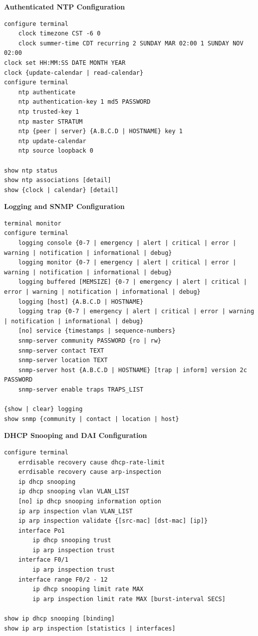 \documentclass[12pt]{article}
\begin{document}
	\textbf{Authenticated NTP Configuration}
	\begin{lstlisting}
configure terminal
	clock timezone CST -6 0
	clock summer-time CDT recurring 2 SUNDAY MAR 02:00 1 SUNDAY NOV 02:00
clock set HH:MM:SS DATE MONTH YEAR
clock {update-calendar | read-calendar}
configure terminal
	ntp authenticate
	ntp authentication-key 1 md5 PASSWORD
	ntp trusted-key 1
	ntp master STRATUM
	ntp {peer | server} {A.B.C.D | HOSTNAME} key 1
	ntp update-calendar
	ntp source loopback 0

show ntp status
show ntp associations [detail]
show {clock | calendar} [detail]
	\end{lstlisting}

	\textbf{Logging and SNMP Configuration}
	\begin{lstlisting}
terminal monitor
configure terminal
	logging console {0-7 | emergency | alert | critical | error | warning | notification | informational | debug}
	logging monitor {0-7 | emergency | alert | critical | error | warning | notification | informational | debug}
	logging buffered [MEMSIZE] {0-7 | emergency | alert | critical | error | warning | notification | informational | debug}
	logging [host] {A.B.C.D | HOSTNAME}
	logging trap {0-7 | emergency | alert | critical | error | warning | notification | informational | debug}
	[no] service {timestamps | sequence-numbers}
	snmp-server community PASSWORD {ro | rw}
	snmp-server contact TEXT
	snmp-server location TEXT
	snmp-server host {A.B.C.D | HOSTNAME} [trap | inform] version 2c PASSWORD
	snmp-server enable traps TRAPS_LIST

{show | clear} logging
show snmp {community | contact | location | host}
	\end{lstlisting}

	\textbf{DHCP Snooping and DAI Configuration}
	\begin{lstlisting}
configure terminal
	errdisable recovery cause dhcp-rate-limit
	errdisable recovery cause arp-inspection
	ip dhcp snooping
	ip dhcp snooping vlan VLAN_LIST
	[no] ip dhcp snooping information option
	ip arp inspection vlan VLAN_LIST
	ip arp inspection validate {[src-mac] [dst-mac] [ip]}
	interface Po1
		ip dhcp snooping trust
		ip arp inspection trust
	interface F0/1
		ip arp inspection trust
	interface range F0/2 - 12
		ip dhcp snooping limit rate MAX
		ip arp inspection limit rate MAX [burst-interval SECS]

show ip dhcp snooping [binding]
show ip arp inspection [statistics | interfaces]
	\end{lstlisting}
\end{document}
